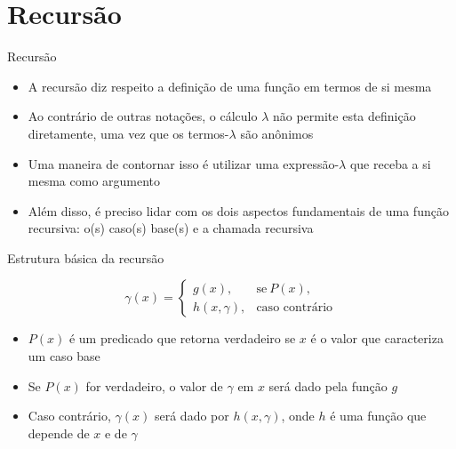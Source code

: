 \section{Recursão}

\begin{frame}[fragile]{Recursão}

    \begin{itemize}
        \item A recursão diz respeito a definição de uma função em termos de si mesma

        \item Ao contrário de outras notações, o cálculo $\lambda$ não permite esta definição
            diretamente, uma vez que os termos-$\lambda$ são anônimos

        \item Uma maneira de contornar isso é utilizar uma expressão-$\lambda$ que receba a 
            si mesma como argumento

        \item Além disso, é preciso lidar com os dois aspectos fundamentais de uma função
            recursiva: o(s) caso(s) base(s) e a chamada recursiva
    \end{itemize}

\end{frame}

\begin{frame}[fragile]{Estrutura básica da recursão}

    \begin{huge}
    \[
        \gamma(x) =  \left\lbrace \begin{array}{ll}
                    g(x), & \mbox{se}\ P(x), \\
                    h(x, \gamma), & \mbox{caso contrário}
                \end{array} \right.
    \]
    \end{huge}

    \begin{itemize}
        \item $P(x)$ é um predicado que retorna verdadeiro se $x$ é o valor que caracteriza um
            caso base

        \item Se $P(x)$ for verdadeiro, o valor de $\gamma$ em $x$ será dado pela função $g$

        \item Caso contrário, $\gamma(x)$ será dado por $h(x, \gamma)$, onde $h$ é uma função 
            que depende de $x$ e de $\gamma$
    \end{itemize}

\end{frame}

